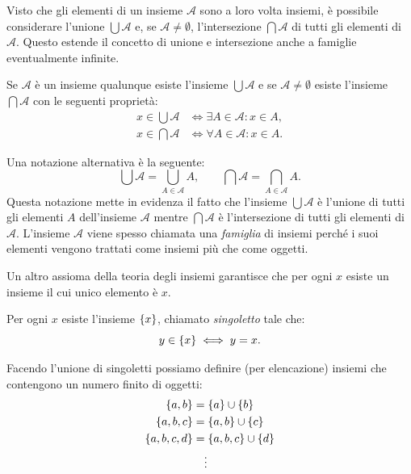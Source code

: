 Visto che gli elementi di un insieme $\mathcal A$ sono a loro volta insiemi,
è possibile considerare l'unione $\bigcup \mathcal A$
e, se 
$\mathcal A \neq \emptyset$, l'intersezione $\bigcap \mathcal A$ di tutti gli elementi
di $\mathcal A$.
Questo estende il concetto di unione e intersezione anche a famiglie
eventualmente infinite.

\begin{axiom}
Se $\mathcal A$ è un insieme qualunque esiste l'insieme $\bigcup \mathcal A$
e se $\mathcal A \neq \emptyset$ esiste l'insieme $\bigcap \mathcal A$
con le seguenti proprietà:
\begin{align*}
  x \in \bigcup \mathcal A & \iff \exists A \in \mathcal A \colon x\in A, \\
  x \in \bigcap \mathcal A & \iff \forall A \in \mathcal A \colon x\in A.
\end{align*}
\end{axiom}
Una notazione alternativa è la seguente:
\[
 \bigcup \mathcal A = \bigcup_{A\in \mathcal A} A, \qquad 
 \bigcap \mathcal A = \bigcap_{A\in \mathcal A} A.  
\]
Questa notazione mette in evidenza il fatto che l'insieme 
$\bigcup \mathcal A$ è l'unione di tutti gli elementi $A$ dell'insieme 
$\mathcal A$ mentre $\bigcap \mathcal A$ è l'intersezione 
di tutti gli elementi di $\mathcal A$.
L'insieme $\mathcal A$ viene spesso chiamata una \emph{famiglia}
di insiemi perché i suoi elementi vengono trattati come insiemi 
più che come oggetti.

Un altro assioma della teoria degli insiemi garantisce che per ogni
$x$ esiste un insieme il cui unico elemento è $x$. 
\begin{axiom}[singoletto]
  Per ogni $x$ esiste l'insieme ${\left\{ x \right\}}$, 
  chiamato \emph{singoletto}%
%
  tale che:
  \[
    y \in {\left\{ x \right\}} \iff y=x.
  \]
\end{axiom}
Facendo l'unione di singoletti possiamo definire (per elencazione) insiemi che contengono
un numero finito di oggetti:
\begin{align*}
  {\left\{ a,b \right\}} &= {\left\{ a \right\}} \cup {\left\{ b \right\}} \\
  {\left\{ a, b, c \right\}} &= {\left\{ a,b \right\}} \cup {\left\{ c \right\}}\\
  {\left\{ a, b, c, d \right\}} &= {\left\{ a,b,c \right\}} \cup {\left\{ d \right\}}\\
  &\quad\vdots
\end{align*}


